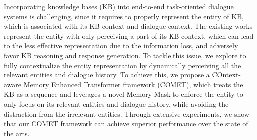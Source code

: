 Incorporating knowledge bases (KB) into end-to-end task-oriented dialogue systems is challenging, since it requires to properly represent the entity of KB, which is associated with its KB context and dialogue context. The existing works represent the entity with only perceiving a part of its KB context, which can lead to the less effective representation due to the information loss, and adversely favor KB reasoning and response generation. To tackle this issue, we explore to fully contextualize the entity representation by dynamically perceiving all the relevant entities and dialogue history. To achieve this, we propose a COntext-aware Memory Enhanced Transformer framework (COMET), which treats the KB as a sequence and leverages a novel Memory Mask to enforce the entity to only focus on its relevant entities and dialogue history, while avoiding the distraction from the irrelevant entities. Through extensive experiments, we show that our COMET framework can achieve superior performance over the state of the arts.
